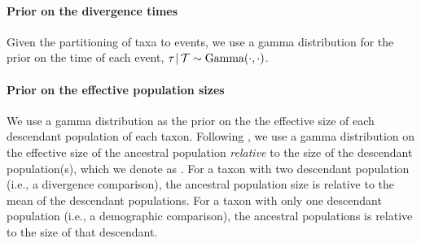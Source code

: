 \paragraph{Prior on the divergence times}
Given the partitioning of taxa to events, we use a gamma
distribution for the prior on the time of each event,
$\tau_{} \,|\, \mathcal{T} \sim \textrm{Gamma}(\cdot, \cdot)$.

\paragraph{Prior on the effective population sizes}
We use a gamma distribution as the prior on the 
the effective size of each descendant population of each taxon.
Following \citet{Oaks2018ecoevolity},
we use a gamma distribution on the effective size of the ancestral population
\emph{relative} to the size of the descendant population(s), which we
denote as \rootrelativepopsize.
For a taxon with two descendant population (i.e., a divergence comparison), the
ancestral population size is relative to the mean of the descendant
populations.
For a taxon with only one descendant population (i.e., a demographic
comparison), the ancestral populations is relative to the size of that
descendant.

